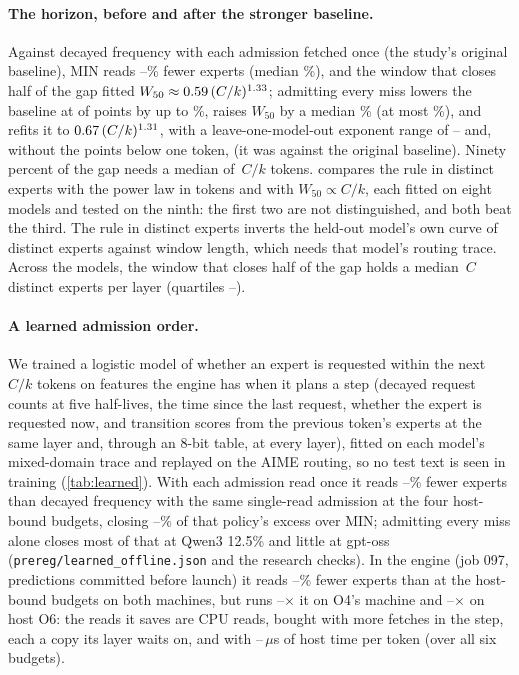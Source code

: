 \paragraph{The horizon, before and after the stronger baseline.} Against decayed frequency with each admission fetched
once (the study's original baseline), MIN reads \fsSaveMin--\fsSaveMax\% fewer experts (median \fsSaveMed\%), and the
window that closes half of the gap fitted $W_{50}\approx0.59\,(C/k)^{1.33}$; admitting every miss lowers the
baseline at \rbAaBeats{} of \rbAaCells{} points by up to \rbAaSaveMax\%, raises $W_{50}$ by a median \rbWRiseMed\% (at
most \rbWRiseMax\%), and refits it to $0.67\,(C/k)^{1.31}$, with a leave-one-model-out exponent range of
\rbExpLomoMin--\rbExpLomoMax{} and, without the points below one token, \rbExpNoInterp{} (it was \rbExpNoInterpOrig{} against
the original baseline). Ninety percent of the gap needs a median of \fsNinety$\,C/k$ tokens.  compares
the rule in distinct experts with the power law in tokens and with $W_{50}\propto C/k$, each fitted on eight models and
tested on the ninth: the first two are not distinguished, and both beat the third. The rule in distinct experts inverts
the held-out model's own curve of distinct experts against window length, which needs that model's routing trace.
Across the \fsModels{} models, the window that closes half of the gap holds a median \dcMed$\,C$ distinct experts per layer
(quartiles \dcLo--\dcHi).



\paragraph{A learned admission order.} We trained a logistic model of whether an expert is requested within the next
$C/k$ tokens on features the engine has when it plans a step (decayed request counts at five half-lives, the time
since the last request, whether the expert is requested now, and transition scores from the previous token's experts
at the same layer and, through an 8-bit table, at every layer), fitted on each model's mixed-domain trace and replayed
on the AIME routing, so no test text is seen in training (\cref{tab:learned}). With each admission read once it reads
\lrnFewerFetchHostMin--\lrnFewerFetchHostMax\% fewer experts than decayed frequency with the same single-read admission
at the four host-bound budgets, closing \lrnFetchHostMin--\lrnFetchHostMax\% of that policy's excess over MIN; admitting
every miss alone closes most of that at Qwen3 12.5\% and little at gpt-oss (\texttt{prereg/learned\_offline.json} and
the research checks). In the engine (job 097, predictions committed before launch) it reads
\lreFewerMin--\lreFewerMax\% fewer experts than \DepOne{} at the host-bound budgets on both
machines, but runs \lreOverFoaFourMin--\lreOverFoaFourMax$\times$ it on O4's machine and
\lreOverFoaSixMin--\lreOverFoaSixMax$\times$ on host O6: the reads it saves are CPU reads, bought with more fetches in
the step, each a copy its layer waits on, and with \lreUsMin--\lreUsMax\,$\mu$s of host time per token (over all six
budgets).

